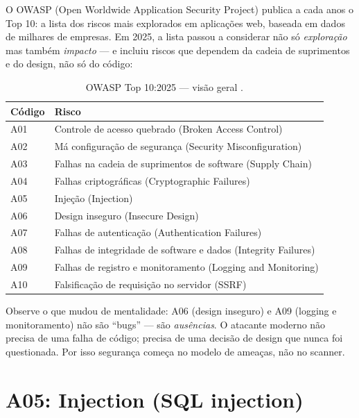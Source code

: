 O OWASP (Open Worldwide Application Security Project) publica a cada anos o
Top 10: a lista dos riscos mais explorados em aplicações web, baseada em dados
de milhares de empresas. Em 2025, a lista passou a considerar não só
\emph{exploração} mas também \emph{impacto} — e incluiu riscos que dependem da
cadeia de suprimentos e do design, não só do código:

\begin{table}[h]
\centering
\small
\caption{OWASP Top 10:2025 — visão geral \cite{owasp2025}.}
\label{tab:owasp}
\begin{tabularx}{\textwidth}{@{}>{\raggedright\arraybackslash}p{1.6cm} X@{}}
\toprule
\textbf{Código} & \textbf{Risco} \\
\midrule
A01 & Controle de acesso quebrado (Broken Access Control) \\
A02 & Má configuração de segurança (Security Misconfiguration) \\
A03 & Falhas na cadeia de suprimentos de software (Supply Chain) \\
A04 & Falhas criptográficas (Cryptographic Failures) \\
A05 & Injeção (Injection) \\
A06 & Design inseguro (Insecure Design) \\
A07 & Falhas de autenticação (Authentication Failures) \\
A08 & Falhas de integridade de software e dados (Integrity Failures) \\
A09 & Falhas de registro e monitoramento (Logging and Monitoring) \\
A10 & Falsificação de requisição no servidor (SSRF) \\
\bottomrule
\end{tabularx}
\end{table}

\begin{caixaconceito}
Observe o que mudou de mentalidade: A06 (design inseguro) e A09 (logging e
monitoramento) não são ``bugs'' — são \emph{ausências}. O atacante moderno não
precisa de uma falha de código; precisa de uma decisão de design que nunca foi
questionada. Por isso segurança começa no modelo de ameaças, não no scanner.
\end{caixaconceito}

\section{A05: Injection (SQL injection)}

